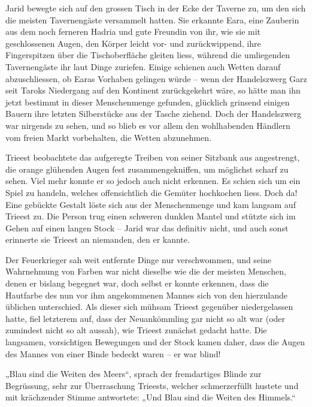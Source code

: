 \documentclass[10pt, a4paper, oneside]{book}
\begin{document}
Jarid bewegte sich auf den grossen Tisch in der Ecke der Taverne zu, um den sich die meisten Tavernengäste versammelt hatten. Sie erkannte Eara, eine Zauberin aus dem noch ferneren Hadria und gute Freundin von ihr, wie sie mit geschlossenen Augen, den Körper leicht vor- und zurückwippend, ihre Fingerspitzen über die Tischoberfläche gleiten liess, während die umliegenden Tavernengäste ihr laut Dinge zuriefen. Einige schienen auch Wetten darauf abzuschliessen, ob Earas Vorhaben gelingen würde – wenn der Handelszwerg Garz seit Taroks Niedergang auf den Kontinent zurückgekehrt wäre, so hätte man ihn jetzt bestimmt in dieser Menschenmenge gefunden, glücklich grinsend einigen Bauern ihre letzten Silberstücke aus der Tasche ziehend. Doch der Handelszwerg war nirgends zu sehen, und so blieb es vor allem den wohlhabenden Händlern vom freien Markt vorbehalten, die Wetten abzunehmen.\bigskip




Trieest beobachtete das aufgeregte Treiben von seiner Sitzbank aus angestrengt, die orange glühenden Augen fest zusammengekniffen, um möglichst scharf zu sehen. Viel mehr konnte er so jedoch auch nicht erkennen. Es schien sich um ein Spiel zu handeln, welches offensichtlich die Gemüter hochkochen liess. Doch da! Eine gebückte Gestalt löste sich aus der Menschenmenge und kam langsam auf Trieest zu. Die Person trug einen schweren dunklen Mantel und stützte sich im Gehen auf einen langen Stock – Jarid war das definitiv nicht, und auch sonst erinnerte sie Trieest an niemanden, den er kannte.

Der Feuerkrieger sah weit entfernte Dinge nur verschwommen, und seine Wahrnehmung von Farben war nicht dieselbe wie die der meisten Menschen, denen er bislang begegnet war, doch selbst er konnte erkennen, dass die Hautfarbe des nun vor ihm angekommenen Mannes sich von den hierzulande üblichen unterschied. Als dieser sich mühsam Trieest gegenüber niedergelassen hatte, fiel letzterem auf, dass der Neuankömmling gar nicht so alt war (oder zumindest nicht so alt aussah), wie Trieest zunächst gedacht hatte. Die langsamen, vorsichtigen Bewegungen und der Stock kamen daher, dass die Augen des Mannes von einer Binde bedeckt waren – er war blind!\bigskip



„Blau sind die Weiten des Meers“, sprach der fremdartiges Blinde zur Begrüssung, sehr zur Überraschung Trieests, welcher schmerzerfüllt hustete und mit krächzender Stimme antwortete: „Und Blau sind die Weiten des Himmels.“
\end{document}
